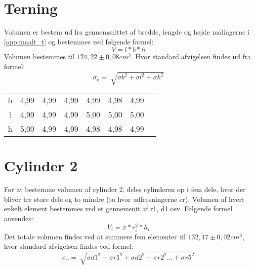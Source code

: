 \label{app:ref_obj_maalt}
\section{Terning}
Volumen er bestem ud fra gennemsnittet af bredde, lengde og højde målingerne i \vref{app:maalt_t} og bestemmes ved følgende formel:
\begin{equation}
V=l*b*h
\end{equation}
Volumen bestemmes til $124,22 \pm 0,08 cm^3$. 
Hvor standard afvigelsen findes ud fra formel:
\begin{equation}
\sigma_v=\sqrt[]{\sigma{b}^2+\sigma{l}^2+\sigma{h}^2}
\end{equation}
\begin{table}[h]
 \centering
\label{app:maalt_t}  
\begin{tabular}{c c c c c c c c}
\toprule
b&4,99&	4,99&	4,99&	4,99&	4,98&	4,99&\\
l&	4,99&	4,99&	4,99&	5,00&	5,00&	5,00&\\
h&	5,00&	4,99&	4,99&	4,98&	4,98&	4,99&\\
\end{tabular}
\end{table}

\section{Cylinder 2}
For at bestemme volumen af cylinder 2, deles cylinderen op i fem dele, hvor der bliver tre store dele og to mindre (to hvor udfresningerne er). Volumen af hvert enkelt element bestemmes ved et gennemsnit af r1, d1 osv. 
Følgende formel anvendes:
\begin{equation}
V_i=\pi*r_i^2*h_i
\end{equation}
Det totale volumen findes ved at summere fem elementer til $132,17 \pm 0,02 cm^3$, hvor standard afvigelsen findes ved formel:
\begin{equation}
\sigma_v=\sqrt[]{\sigma{d1}^2+\sigma{r1}^2+\sigma{d2}^2+\sigma{r2}^2...+\sigma{r5}^2}	
\end{equation}

